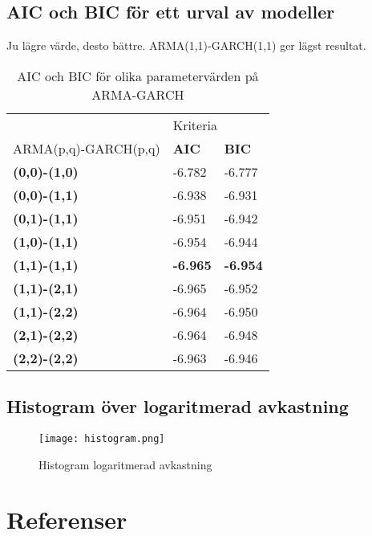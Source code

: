 \documentclass[11pt]{article}
\numberwithin{equation}{section}
\numberwithin{table}{section}
\numberwithin{figure}{section}
\begin{document}
\subsection{AIC och BIC för ett urval av modeller}
Ju lägre värde, desto bättre. ARMA(1,1)-GARCH(1,1) ger lägst resultat.
\begin{table}[H]
\caption{AIC och BIC för olika parametervärden på ARMA-GARCH}
\begin{tabular}{||lll||}
\hline
& \multicolumn{2}{l||}{Kriteria} \\
ARMA(p,q)-GARCH(p,q) & \textbf{AIC} & \textbf{BIC}\\ \hline\hline
{\textbf{(0,0)-(1,0)}} & -6.782  & -6.777 \\ \cline{2-3} 
{\textbf{(0,0)-(1,1)}} & -6.938  & -6.931 \\ \cline{2-3}
{\textbf{(0,1)-(1,1)}} & -6.951  & -6.942 \\ \cline{2-3} 
{\textbf{(1,0)-(1,1)}} & -6.954  & -6.944 \\ \cline{2-3} 
{\textbf{(1,1)-(1,1)}} & \textbf{-6.965}  & \textbf{-6.954} \\ \cline{2-3} 
{\textbf{(1,1)-(2,1)}} & -6.965  & -6.952 \\ \cline{2-3} 
{\textbf{(1,1)-(2,2)}} & -6.964  & -6.950 \\ \cline{2-3}
{\textbf{(2,1)-(2,2)}} & -6.964  & -6.948 \\ \cline{2-3} 
{\textbf{(2,2)-(2,2)}} & -6.963  & -6.946 \\ \hline
\end{tabular}
\end{table}


\subsection{Histogram över logaritmerad avkastning}
\begin{figure}[H]
\caption{Histogram logaritmerad avkastning}
\texttt{[image: histogram.png]}
\centering
\end{figure}


\newpage
\section*{Referenser}
\printbibliography[heading=none]
\end{document}
